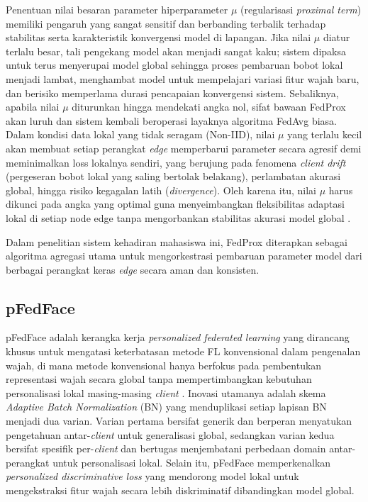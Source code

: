 Penentuan nilai besaran parameter hiperparameter $\mu$ (regularisasi \textit{proximal term}) memiliki pengaruh yang sangat sensitif dan berbanding terbalik terhadap stabilitas serta karakteristik konvergensi model di lapangan. Jika nilai $\mu$ diatur terlalu besar, tali pengekang model akan menjadi sangat kaku; sistem dipaksa untuk terus menyerupai model global sehingga proses pembaruan bobot lokal menjadi lambat, menghambat model untuk mempelajari variasi fitur wajah baru, dan berisiko memperlama durasi pencapaian konvergensi sistem. Sebaliknya, apabila nilai $\mu$ diturunkan hingga mendekati angka nol, sifat bawaan FedProx akan luruh dan sistem kembali beroperasi layaknya algoritma FedAvg biasa. Dalam kondisi data lokal yang tidak seragam (Non-IID), nilai $\mu$ yang terlalu kecil akan membuat setiap perangkat \textit{edge} memperbarui parameter secara agresif demi meminimalkan loss lokalnya sendiri, yang berujung pada fenomena \textit{client drift} (pergeseran bobot lokal yang saling bertolak belakang), perlambatan akurasi global, hingga risiko kegagalan latih (\textit{divergence}). Oleh karena itu, nilai $\mu$ harus dikunci pada angka yang optimal guna menyeimbangkan fleksibilitas adaptasi lokal di setiap node edge tanpa mengorbankan stabilitas akurasi model global \parencite{Xiong2025}.

Dalam penelitian sistem kehadiran mahasiswa ini, FedProx diterapkan sebagai algoritma agregasi utama untuk mengorkestrasi pembaruan parameter model dari berbagai perangkat keras \textit{edge} secara aman dan konsisten.

\subsection{pFedFace}
\label{subsec:pfedface-teori}

pFedFace adalah kerangka kerja \textit{personalized federated learning} yang dirancang khusus untuk mengatasi keterbatasan metode FL konvensional dalam pengenalan wajah, di mana metode konvensional hanya berfokus pada pembentukan representasi wajah secara global tanpa mempertimbangkan kebutuhan personalisasi lokal masing-masing \textit{client} \parencite{Gao2025}. Inovasi utamanya adalah skema \textit{Adaptive Batch Normalization} (BN) yang menduplikasi setiap lapisan BN menjadi dua varian. Varian pertama bersifat generik dan berperan menyatukan pengetahuan antar-\textit{client} untuk generalisasi global, sedangkan varian kedua bersifat spesifik per-\textit{client} dan bertugas menjembatani perbedaan domain antar-perangkat untuk personalisasi lokal. Selain itu, pFedFace memperkenalkan \textit{personalized discriminative loss} yang mendorong model lokal untuk mengekstraksi fitur wajah secara lebih diskriminatif dibandingkan model global.

